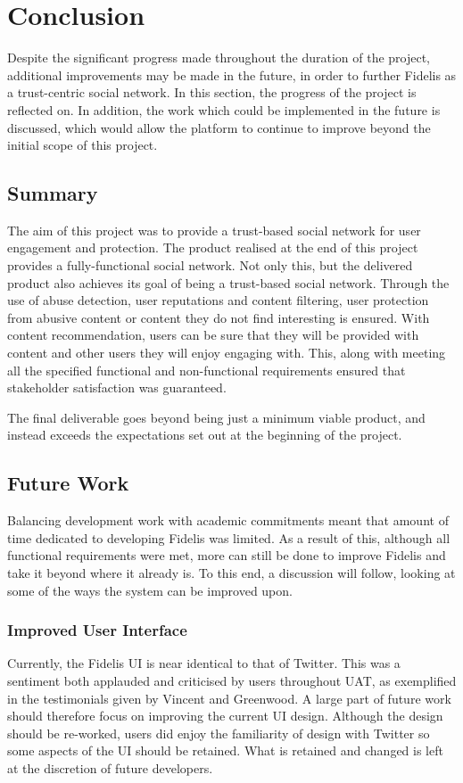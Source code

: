 \chapter{Conclusion}
\label{Chapter:Conclusion}
Despite the significant progress made throughout the duration of the project, additional improvements may be made in the future, in order to further Fidelis as a trust-centric social network. In this section, the progress of the project is reflected on. In addition, the work which could be implemented in the future is discussed, which would allow the platform to continue to improve beyond the initial scope of this project.

\section{Summary}
The aim of this project was to provide a trust-based social network for user engagement and protection. The product realised at the end of this project provides a fully-functional social network. Not only this, but the delivered product also achieves its goal of being a trust-based social network. Through the use of abuse detection, user reputations and content filtering, user protection from abusive content or content they do not find interesting is ensured. With content recommendation, users can be sure that they will be provided with content and other users they will enjoy engaging with. This, along with meeting all the specified functional and non-functional requirements ensured that stakeholder satisfaction was guaranteed. 

The final deliverable goes beyond being just a minimum viable product, and instead exceeds the expectations set out at the beginning of the project.

\section{Future Work}
Balancing development work with academic commitments meant that amount of time dedicated to developing Fidelis was limited. As a result of this, although all functional requirements were met, more can still be done to improve Fidelis and take it beyond where it already is. To this end, a discussion will follow, looking at some of the ways the system can be improved upon.

\subsection{Improved User Interface}
Currently, the Fidelis UI is near identical to that of Twitter. This was a sentiment both applauded and criticised by users throughout UAT, as exemplified in the testimonials given by Vincent and Greenwood. A large part of future work should therefore focus on improving the current UI design. Although the design should be re-worked, users did enjoy the familiarity of design with Twitter so some aspects of the UI should be retained. What is retained and changed is left at the discretion of future developers.

